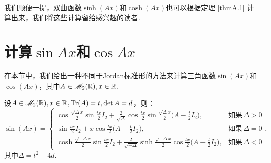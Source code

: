 \begin{remark}
  我们顺便一提，双曲函数$\sinh(Ax)$和$\cosh(Ax)$也可以根据定理 \ref{thmA.1} 计算出来，我们将这些计算留给感兴趣的读者.
\end{remark}

\section{计算$\sin Ax$和$\cos Ax$}

在本节中，我们给出一种不同于Jordan标准形的方法来计算三角函数$\sin(Ax)$和$\cos(Ax)$，其中$A\in\mathscr M_2(\mathbb R),x\in\mathbb R$.
\begin{mybox}
  \begin{theorem}

    设$A\in\mathscr M_2(\mathbb R),x\in\mathbb R,\operatorname{Tr}(A)=t,\det A=d$，则：
    \[
      \sin(Ax) = \begin{cases}
        \cos\frac{\sqrt{\varDelta}x}2\sin\frac{tx}2I_2 + \frac2{\sqrt{\varDelta}} \cos\frac{tx}2 \sin\frac{\sqrt{\varDelta}x}2 \Big( A - \frac t2I_2 \Big), & \text{如果}\, \varDelta > 0 \\
        \sin \frac{tx}2I_2 + x\cos\frac{tx}2 \Big( A - \frac t2I_2 \Big), & \text{如果}\, \varDelta = 0 \\
        \cosh\frac{\sqrt{-\varDelta}x}2\sin\frac{tx}2I_2 + \frac2{\sqrt{-\varDelta}} \sinh\frac{\sqrt{-\varDelta}x}2\cos\frac{tx}2 \Big( A - \frac t2I_2 \Big), & \text{如果}\, \varDelta < 0
      \end{cases},
    \]
    其中$\varDelta=t^2-4d$.
  \end{theorem}
\end{mybox}

